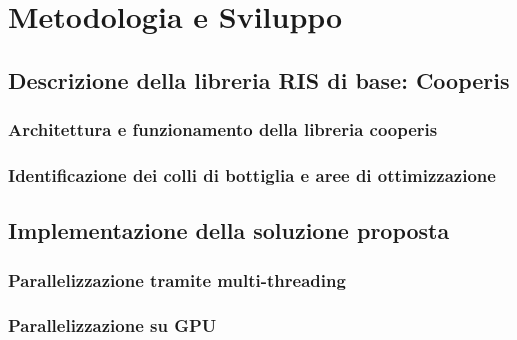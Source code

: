 \chapter{Metodologia e Sviluppo}
\label{ch:metodologiasviluppo}

\section{Descrizione della libreria RIS di base: Cooperis}
\label{sec:libreria}

\lipsum[1]

\subsection{Architettura e funzionamento della libreria cooperis}
\label{sec:architettura}

\lipsum[1]

\subsection{Identificazione dei colli di bottiglia e aree di ottimizzazione}
\label{sec:ottimizzazione}

\lipsum[1]

\section{Implementazione della soluzione proposta}
\label{sec:implementazione}

\lipsum[1]

\subsection{Parallelizzazione tramite multi-threading}
\label{subsec:multithreading}

\lipsum[1]

\subsection{Parallelizzazione su GPU}
\label{subsec:cuda}

\lipsum[1]
